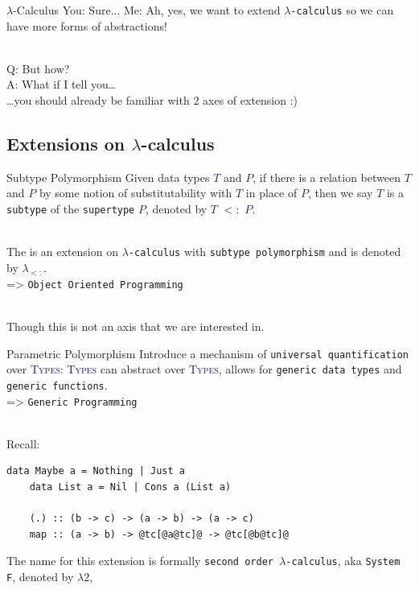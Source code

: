 \documentclass[xcolor={usenames,dvipsnames}]{beamer}
\newcommand{\htycon}[1]{\textcolor{MidnightBlue}{\textsc{#1}}}
\begin{document}
\begin{frame}[fragile]{$\lambda$-Calculus}
  You: Sure...
  Me: Ah, yes, we want to extend \texttt{$\lambda$-calculus} so we can have more forms of abstractions!

  \ \\
  \pause
  Q: But how?\\
  A: What if I tell you\ldots\\
  \qquad \ldots you should already be familiar with 2 axes of extension :)
\end{frame}


\subsection{Extensions on $\lambda$-calculus}

\begin{frame}[fragile]{Subtype Polymorphism}
  Given data types \htycon{$T$} and \htycon{$P$}, if there is a relation between \htycon{$T$} and \htycon{$P$} by some notion of substitutability with \htycon{$T$} in place of \htycon{$P$}, then we say \htycon{$T$} is a \texttt{subtype} of the \texttt{supertype} \htycon{$P$}, denoted by \htycon{$T$} $<:$ \htycon{$P$}.

  \ \\
  The is an extension on \texttt{$\lambda$-calculus} with \texttt{subtype polymorphism} and is denoted by $\lambda_{<:}$.\\
  => \texttt{Object Oriented Programming}
  
  \ \\
  \scriptsize{Though this is not an axis that we are interested in}.
\end{frame}

\begin{frame}[fragile]{Parametric Polymorphism}
  Introduce a mechanism of \texttt{universal quantification} over \htycon{Types}: \htycon{Types} can abstract over \htycon{Types}, allows for \texttt{generic data types} and \texttt{generic functions}.\\
  => \texttt{Generic Programming}

  \ \\
  Recall:
  \begin{lstlisting}[style=hask]
    data Maybe a = Nothing | Just a
    data List a = Nil | Cons a (List a)

    (.) :: (b -> c) -> (a -> b) -> (a -> c)
    map :: (a -> b) -> @tc[@a@tc]@ -> @tc[@b@tc]@
  \end{lstlisting}

  The name for this extension is formally \texttt{second order $\lambda$-calculus}, aka \texttt{System F}, denoted by $\lambda2$,
\end{frame}
\end{document}
